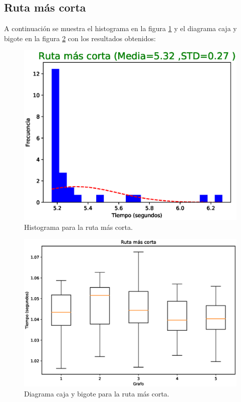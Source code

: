 \documentclass{article}
\begin{document}
\subsection{Ruta más corta}
A continuación se muestra el histograma en la figura \ref{fig:H1} y el diagrama caja y bigote en la figura \ref{fig:BP1} con los resultados obtenidos:
\begin{figure}[H]
    \includegraphics[width=\textwidth]{H1}
    \caption{Histograma para la ruta más corta.}
    \label{fig:H1}
\end{figure}
\begin{figure}[H]
    \includegraphics[width=\textwidth]{BP1}
    \caption{Diagrama caja y bigote para la ruta más corta.}
    \label{fig:BP1}
\end{figure}
\end{document}
